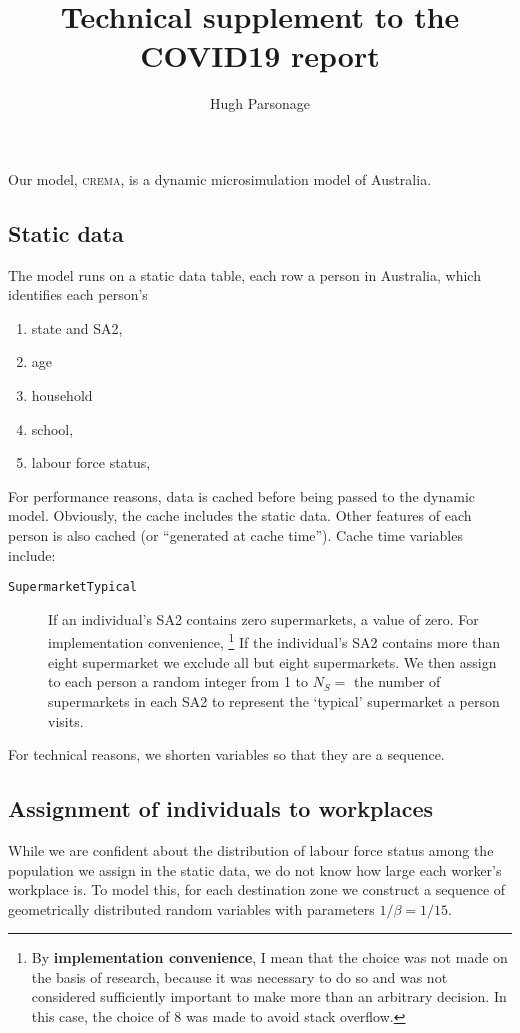 \documentclass[a4paper,11pt]{scrreprt}
\title{Technical supplement to the COVID19 report}
\author{Hugh Parsonage}
\newcommand*{\code}[1]{\texttt{#1}}
\newcommand*{\defi}[1]{\textbf{#1}}
\providecommand{\crema}{\textsc{crema}}
\begin{document}
Our model, \crema, is a dynamic microsimulation model of Australia. 

\subsection{Static data}
The model runs on a static data table, each row a person in Australia, 
which identifies each person's

\begin{enumerate}
	\item state and SA2,
	\item age
	\item household
	\item school,
	\item labour force status,
\end{enumerate}

For performance reasons, data is cached before being passed to the dynamic model.
Obviously, the cache includes the static data. Other features of each person is 
also cached (or ``generated at cache time''). Cache time variables include:

\begin{description}
\item[\code{SupermarketTypical}] If an individual's SA2 contains zero supermarkets, 
a value of zero. 
For implementation convenience,%
	\footnote{By \defi{implementation convenience}, I mean that the choice was not made 
	on the basis of research, because it was necessary to do so and was not considered 
	sufficiently important to make more than an arbitrary decision. In this case,
	the choice of 8 was made to avoid stack overflow.}
If the individual's SA2 contains more than eight supermarket we 
exclude all but eight supermarkets. We then assign to each person a random integer
from 1 to \(N_S = {}\) the number of supermarkets in each SA2 to represent the 
`typical' supermarket a person visits.
\end{description}

For technical reasons, we shorten variables so that they are a sequence. 

\subsection{Assignment of individuals to workplaces}
While we are confident about the distribution of labour force status among
the population we assign in the static data, we do not know how large each 
worker's workplace is. To model this, for each destination zone we construct
a sequence of geometrically distributed random variables with parameters 
\(1/\beta = 1/15\). 
\end{document}
